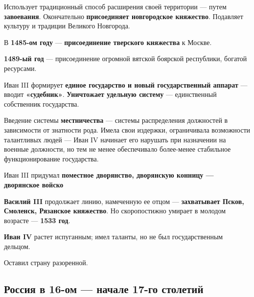 \documentclass{article}
\begin{document}
Использует традиционный способ расширения своей территории — путем \textbf{завоевания}. Окончательно \textbf{присоединяет новгородское княжество}. Подавляет культуру и традиции Великого Новгорода.

В \textbf{1485-ом году} — \textbf{присоединение тверского княжества} к Москве.

\textbf{1489-ый год} — присоединение огромной вятской боярской республики, богатой ресурсами.

Иван III формирует \textbf{единое государство и новый государственный аппарат} — вводит \textbf{«судебник»}. \textbf{Уничтожает удельную систему} — единственный собственник государства.

Введение системы \textbf{местничества} — системы распределения должностей в зависимости от знатности рода. Имела свои издержки, ограничивала возможности талантливых людей — Иван IV начинает его нарушать при назначении на военные должности, но тем не менее обеспечивало более-менее стабильное функционирование государства.

Иван III придумал \textbf{поместное дворянство, дворянскую конницу — дворянское войско}

\hfill

\textbf{Василий III} продолжает линию, намеченную ее отцом — \textbf{захватывает Псков, Смоленск, Рязанское княжество}. Но скоропостижно умирает в молодом возрасте — \textbf{1533 год}.

\hfill

\textbf{Иван IV} растет испуганным; имел таланты, но не был государственным дельцом.

Оставил страну разоренной.

\subsection{Россия в 16-ом — начале 17-го столетий}
\end{document}
